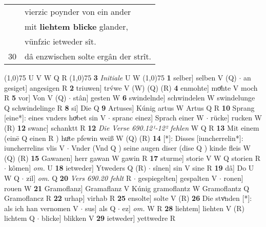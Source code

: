 \documentclass[8pt,a4paper,notitlepage]{article}
\begin{document}
\begin{table}[ht]
\begin{minipage}[t]{0.5\linewidth}
\begin{tabular}{rl}
 & vierzic poynder von ein ander\\ 
 & mit \textbf{liehtem blicke} glander,\\ 
 & vünfzic ietweder sît.\\ 
30 & dâ enzwischen solte ergân der strît.\\ 
\end{tabular}
\scriptsize
\line(1,0){75} \newline
U V W Q R \newline
\line(1,0){75} \newline
\textbf{3} \textit{Initiale} U W  \newline
\line(1,0){75} \newline
\textbf{1} selber] selben V (Q)  $\cdot$ an gesiget] angesigen R \textbf{2} triuwen] trv́we V (W) (Q) (R) \textbf{4} enmohte] moͤhte V moch R \textbf{5} vor] Von V (Q)  $\cdot$ stân] gesten W \textbf{6} swindelnde] schwindelen W swindelunge Q schwindelinge R \textbf{8} si] Die Q \textbf{9} Artuses] Kúnig artus W Artus Q R \textbf{10} Sprang [eine*]: eines vnders hoͮbet sin V  $\cdot$ spranc einez] Sprach einer W  $\cdot$ rücke] rucken W (R) \textbf{12} swanc] schanktt R \textbf{12} \textit{Die Verse 690.12¹-12² fehlen} W Q R  \textbf{13} Mit einem (einē Q einen R ) huͦte pfewin weiß W (Q) (R) \textbf{14} [*]: Disses [iuncherrelin*]: iuncherrelins vlis V  $\cdot$ Vnder (Vnd Q ) seine augen diser (dise Q ) kinde fleis W (Q) (R) \textbf{15} Gawanen] herr gawan W gawin R \textbf{17} sturme] storie V W Q storien R  $\cdot$ kômen] \textit{om.} U \textbf{18} ietweder] Ytweders Q (R)  $\cdot$ sînen] sin V sine R \textbf{19} dâ] Do U W Q  $\cdot$ zil] \textit{om.} Q \textbf{20} \textit{Vers 690.20 fehlt} R   $\cdot$ gespiegelten] gespalten V  $\cdot$ ronen] rouen W \textbf{21} Gramoflanz] Gramaflanz V Kúnig gramoflantz W Gramoflantz Q Gramoflancz R \textbf{22} urhap] virhab R \textbf{25} ensolte] solte V (R) \textbf{26} Die stvͦnden [*]: als ich han vernomen V  $\cdot$ sus] als Q  $\cdot$ ez] \textit{om.} W R \textbf{28} liehtem] liehten V (R) lichtem Q  $\cdot$ blicke] blikken V \textbf{29} ietweder] yettwedre R \newline
\end{minipage}
\end{table}
\end{document}
